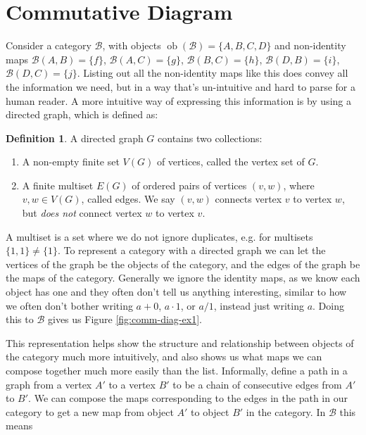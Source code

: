 \documentclass[logo,bsc,singlespacing,parskip]{infthesis}
\theoremstyle{definition}
\newtheorem{defn}[prop]{Definition}
\newcommand{\cat}[1]{\mathscr{#1}}
\newcommand{\ob}[1]{\obj(\mathscr{#1})}
\DeclareMathOperator{\obj}{ob}
\begin{document}
\section{Commutative Diagram}
Consider a category $\cat B$, with objects $\ob{B} = \{A,B,C,D\}$ and non-identity maps $\cat{B}(A,B) = \{f\}$, $\cat{B}(A,C) = \{g\}$, $\cat{B}(B,C) = \{h\}$, $\cat{B}(D,B) = \{i\}$, $\cat{B}(D,C) = \{j\}$. Listing out all the non-identity maps like this does convey all the information we need, but in a way that's un-intuitive and hard to parse for a human reader. A more intuitive way of expressing this information is by using a directed graph, which is defined as:
\begin{defn}
    A directed graph $G$ contains two collections:
    \begin{enumerate}
        \item A non-empty finite set $V(G)$ of vertices, called the vertex set of $G$.
        \item A finite multiset $E(G)$ of ordered pairs of vertices $(v,w)$, where $v, w \in V(G)$, called edges. We say $(v,w)$ connects vertex $v$ to vertex $w$, but \emph{does not} connect vertex $w$ to vertex $v$.
    \end{enumerate}
\end{defn}
A multiset is a set where we do not ignore duplicates, e.g. for multisets $\{1, 1\} \ne \{1\}$. To represent a category with a directed graph we can let the vertices of the graph be the objects of the category, and the edges of the graph be the maps of the category. Generally we ignore the identity maps, as we know each object has one and they often don't tell us anything interesting, similar to how we often don't bother writing $a + 0$, $a \cdot 1$, or $a/1$, instead just writing $a$. Doing this to $\cat B$ gives us Figure \ref{fig:comm-diag-ex1}. 

This representation helps show the structure and relationship between objects of the category much more intuitively, and also shows us what maps we can compose together much more easily than the list. Informally, define a path in a graph from a vertex $A'$ to a vertex $B'$ to be a chain of consecutive edges from $A'$ to $B'$. We can compose the maps corresponding to the edges in the path in our category to get a new map from object $A'$ to object $B'$ in the category. In $\cat B$ this means 
\end{document}
